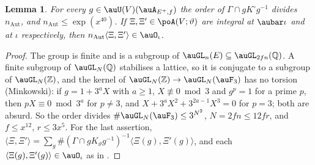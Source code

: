 \documentclass[10pt]{amsart}
\newtheorem{lemma}[theorem]{Lemma}
\theoremstyle{definition}
\theoremstyle{remark}
\newcommand{\Z}{\mathbb Z}
\newcommand{\Q}{\mathbb Q}
\begin{document}
\begin{lemma}\label{po:naut}
For every $g\in\auU(V)(\auA_{E^+,f})$ the order of $\Gamma\cap gK^\circ g^{-1}$ divides
$n_{\mathrm{Aut}}$, and $n_{\mathrm{Aut}}\le\exp(x^{40})$. If $\Xi,\Xi'\in\poA(V;\vartheta)$ are
integral at $\aubar\iota$ and at $\iota$ respectively, then $n_{\mathrm{Aut}}\langle\Xi,\Xi'\rangle
\in\auO_\iota$.
\end{lemma}
\begin{proof}
The group is finite and is a subgroup of $\auGL_n(E)\subseteq\auGL_{2fn}(\Q)$. A finite subgroup of
$\auGL_N(\Q)$ stabilises a lattice, so it is conjugate to a subgroup of $\auGL_N(\Z)$, and the
kernel of $\auGL_N(\Z)\to\auGL_N(\auF_3)$ has no torsion (Minkowski): if $g=1+3^aX$ with $a\ge1$,
$X\not\equiv0\bmod3$ and $g^p=1$ for a prime $p$, then $pX\equiv0\bmod3^{a}$ for $p\ne3$, and
$X+3^aX^2+3^{2a-1}X^3=0$ for $p=3$; both are absurd. So the order divides $\#\auGL_N(\auF_3)\le
3^{N^2}$, $N=2fn\le12fr$, and $f\le x^{12}$, $r\le3x^5$. For the last assertion,
$\langle\Xi,\Xi'\rangle=\sum_g\#(\Gamma\cap gK_\vartheta g^{-1})^{-1}\langle\Xi(g),\Xi'(g)\rangle$,
and each $\langle\Xi(g),\Xi'(g)\rangle\in\auO_\iota$ as in {\cite[\S14.3]{P46}}.
\end{proof}
\end{document}
